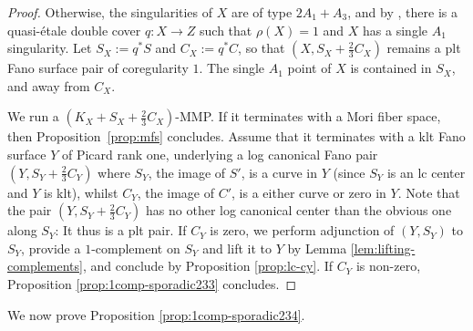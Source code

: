 \documentclass{amsart}
\theoremstyle{definition}
\theoremstyle{remark}
\numberwithin{equation}{section}
\begin{document}
\begin{proof}
Otherwise, the singularities of $X$ are of type $2A_1+A_3$, and by \cite[Lemma 6, Table I]{MZ88}, there is a quasi-\'etale double cover $q\colon X\rightarrow Z$ such that $\rho(X)=1$ and $X$ has a single $A_1$ singularity.
Let $S_X:=q^*S$ and $C_X:=q^*C$, so that
$(X,S_X+\frac{2}{3}C_X)$ remains a plt Fano surface pair of coregularity $1$. The single $A_1$ point of $X$ is contained in $S_X$, and away from $C_X$.

We run a $(K_{X}+S_X+\frac{2}{3}C_X)$-MMP. 
If it terminates with a Mori fiber space, then Proposition~\ref{prop:mfs} concludes.
Assume that it terminates with a klt Fano surface $Y$ of Picard rank one, underlying a log canonical Fano pair $(Y,S_Y+\frac{2}{3}C_Y)$ where $S_Y$, the image of $S'$, is a curve in $Y$ (since $S_Y$ is an lc center and $Y$ is klt), whilst $C_Y$, the image of $C'$, is a either curve or zero in $Y$. Note that the pair $(Y,S_Y+\frac{2}{3}C_Y)$ has no other log canonical center than the obvious one along $S_Y$: It thus is a plt pair.
If $C_Y$ is zero, we perform adjunction of $(Y,S_Y)$ to $S_Y$, provide a $1$-complement on $S_Y$ and lift it to $Y$ by Lemma \ref{lem:lifting-complements}, and conclude by Proposition \ref{prop:lc-cy}.
If $C_Y$ is non-zero, Proposition \ref{prop:1comp-sporadic233} concludes.
\end{proof}

We now prove Proposition \ref{prop:1comp-sporadic234}.
\end{document}
